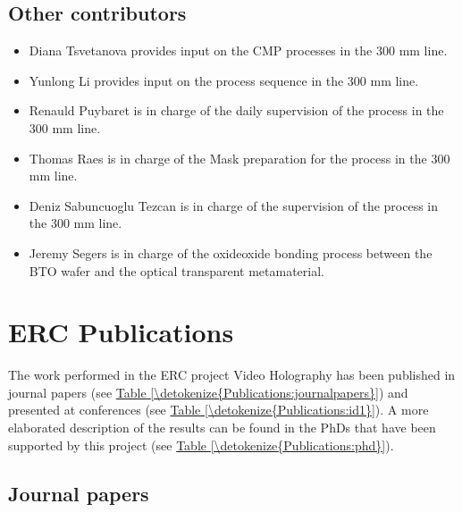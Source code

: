 \documentclass[a4paper,10pt,english,openany,oneside]{jupyterBook}
\begin{document}
\section{Other contributors}
\label{\detokenize{Team:other-contributors}}\begin{itemize}
\item {} 
\sphinxAtStartPar
Diana Tsvetanova provides input on the CMP processes in the 300 mm line.

\item {} 
\sphinxAtStartPar
Yunlong Li provides input on the process sequence in the 300 mm line.

\item {} 
\sphinxAtStartPar
Renauld Puybaret is in charge of the daily supervision of the process in the 300 mm line.

\item {} 
\sphinxAtStartPar
Thomas Raes is in charge of the Mask preparation for the process in the 300 mm line.

\item {} 
\sphinxAtStartPar
Deniz Sabuncuoglu Tezcan is in charge of the supervision of the process in the 300 mm line.

\item {} 
\sphinxAtStartPar
Jeremy Segers is in charge of the oxide\sphinxhyphen{}oxide bonding process between the BTO wafer and the optical transparent metamaterial.

\end{itemize}

\sphinxstepscope


\chapter{ERC Publications}
\label{\detokenize{Publications:erc-publications}}\label{\detokenize{Publications::doc}}
\sphinxAtStartPar
The work performed in the ERC project Video Holography has been published in journal papers (see \hyperref[\detokenize{Publications:journalpapers}]{Table \ref{\detokenize{Publications:journalpapers}}}) and presented at conferences (see \hyperref[\detokenize{Publications:id1}]{Table \ref{\detokenize{Publications:id1}}}). A more elaborated description of the results can be found in the PhDs that have been supported by this project (see \hyperref[\detokenize{Publications:phd}]{Table \ref{\detokenize{Publications:phd}}}).


\section{Journal papers}
\label{\detokenize{Publications:journal-papers}}
\end{document}
